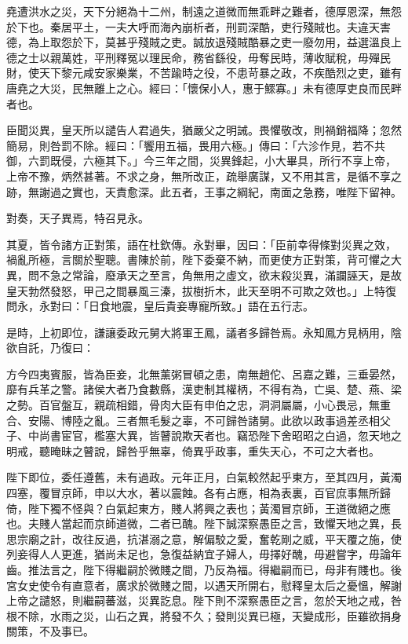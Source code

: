 \begin{pinyinscope}
堯遭洪水之災，天下分絕為十二州，制遠之道微而無乖畔之難者，德厚恩深，無怨於下也。秦居平土，一夫大呼而海內崩析者，刑罰深酷，吏行殘賊也。夫違天害德，為上取怨於下，莫甚乎殘賊之吏。誠放退殘賊酷暴之吏一廢勿用，益選溫良上德之士以親萬姓，平刑釋冤以理民命，務省繇役，毋奪民時，薄收賦稅，毋殫民財，使天下黎元咸安家樂業，不苦踰時之役，不患苛暴之政，不疾酷烈之吏，雖有唐堯之大災，民無離上之心。經曰：「懷保小人，惠于鰥寡。」未有德厚吏良而民畔者也。

臣聞災異，皇天所以譴告人君過失，猶嚴父之明誡。畏懼敬改，則禍銷福降；忽然簡易，則咎罰不除。經曰：「饗用五福，畏用六極。」傳曰：「六沴作見，若不共御，六罰既侵，六極其下。」今三年之間，災異鋒起，小大畢具，所行不享上帝，上帝不豫，炳然甚著。不求之身，無所改正，疏舉廣謀，又不用其言，是循不享之跡，無謝過之實也，天責愈深。此五者，王事之綱紀，南面之急務，唯陛下留神。

對奏，天子異焉，特召見永。

其夏，皆令諸方正對策，語在杜欽傳。永對畢，因曰：「臣前幸得條對災異之效，禍亂所極，言關於聖聰。書陳於前，陛下委棄不納，而更使方正對策，背可懼之大異，問不急之常論，廢承天之至言，角無用之虛文，欲末殺災異，滿讕誣天，是故皇天勃然發怒，甲己之間暴風三溱，拔樹折木，此天至明不可欺之效也。」上特復問永，永對曰：「日食地震，皇后貴妾專寵所致。」語在五行志。

是時，上初即位，謙讓委政元舅大將軍王鳳，議者多歸咎焉。永知鳳方見柄用，陰欲自託，乃復曰：

方今四夷賓服，皆為臣妾，北無薰粥冒頓之患，南無趙佗、呂嘉之難，三垂晏然，靡有兵革之警。諸侯大者乃食數縣，漢吏制其權柄，不得有為，亡吳、楚、燕、梁之勢。百官盤互，親疏相錯，骨肉大臣有申伯之忠，洞洞屬屬，小心畏忌，無重合、安陽、博陸之亂。三者無毛髮之辜，不可歸咎諸舅。此欲以政事過差丞相父子、中尚書宦官，檻塞大異，皆瞽說欺天者也。竊恐陛下舍昭昭之白過，忽天地之明戒，聽晻昧之瞽說，歸咎乎無辜，倚異乎政事，重失天心，不可之大者也。

陛下即位，委任遵舊，未有過政。元年正月，白氣較然起乎東方，至其四月，黃濁四塞，覆冒京師，申以大水，著以震蝕。各有占應，相為表裏，百官庶事無所歸倚，陛下獨不怪與？白氣起東方，賤人將興之表也；黃濁冒京師，王道微絕之應也。夫賤人當起而京師道微，二者已醜。陛下誠深察愚臣之言，致懼天地之異，長思宗廟之計，改往反過，抗湛溺之意，解偏駮之愛，奮乾剛之威，平天覆之施，使列妾得人人更進，猶尚未足也，急復益納宜子婦人，毋擇好醜，毋避嘗字，毋論年齒。推法言之，陛下得繼嗣於微賤之間，乃反為福。得繼嗣而已，母非有賤也。後宮女史使令有直意者，廣求於微賤之間，以遇天所開右，慰釋皇太后之憂慍，解謝上帝之譴怒，則繼嗣蕃滋，災異訖息。陛下則不深察愚臣之言，忽於天地之戒，咎根不除，水雨之災，山石之異，將發不久；發則災異已極，天變成形，臣雖欲捐身關策，不及事已。


\end{pinyinscope}
